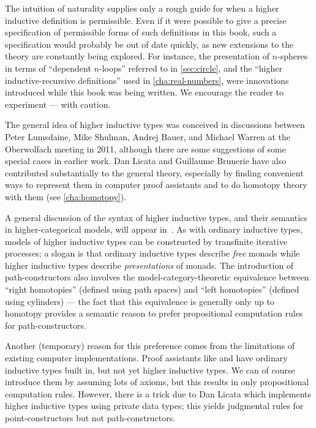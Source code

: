 The intuition of naturality supplies only a rough guide for when a higher inductive definition is permissible.
Even if it were possible to give a precise specification of permissible forms of such definitions in this book, such a specification would probably be out of date quickly, as new extensions to the theory are constantly being explored.
For instance, the presentation of $n$-spheres in terms of ``dependent $n$-loops'' referred to in \autoref{sec:circle}, and the ``higher inductive-recursive definitions'' used in \autoref{cha:real-numbers}, were innovations introduced while this book was being written.
We encourage the reader to experiment --- with caution.


\sectionNotes

The general idea of higher inductive types was conceived in discussions between Peter Lumsdaine, Mike Shulman, Andrej Bauer, and Michael Warren at the Oberwolfach meeting in 2011, although there are some suggestions of some special cases in earlier work.
Dan Licata and Guillaume Brunerie have also contributed substantially to the general theory, especially by finding convenient ways to represent them in computer proof assistants and to do homotopy theory with them (see \autoref{cha:homotopy}).

A general discussion of the syntax of higher inductive types, and their semantics in higher-categorical models, will appear in~\cite{ls:hits}.
As with ordinary inductive types, models of higher inductive types can be constructed by transfinite iterative processes; a slogan is that ordinary inductive types describe \emph{free} monads while higher inductive types describe \emph{presentations} of monads.
The introduction of path-constructors also involves the model-category-theoretic equivalence between ``right homotopies'' (defined using path spaces) and ``left homotopies'' (defined using cylinders) --- the fact that this equivalence is generally only up to homotopy provides a semantic reason to prefer propositional computation rules for path-constructors.

Another (temporary) reason for this preference comes from the limitations of existing computer implementations.
Proof assistants like \Coq and \Agda have ordinary inductive types built in, but not yet higher inductive types.
We can of course introduce them by assuming lots of axioms, but this results in only propositional computation rules.
However, there is a trick due to Dan Licata which implements higher inductive types using private data types; this yields judgmental rules for point-constructors but not path-constructors.

